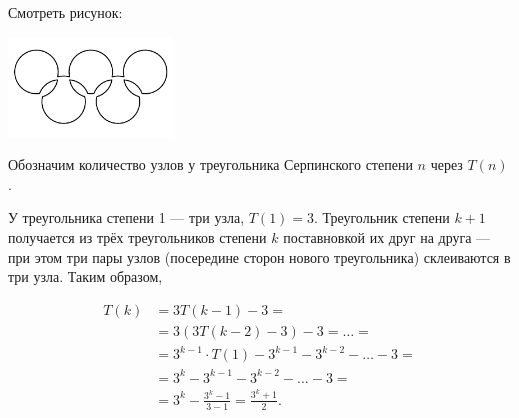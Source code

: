 
\begin{itemize}
\itA Смотреть рисунок:
\vfill\eject

\begin{multicols}{2}

\begin{center}
	\includegraphics[width=4.4cm]{figures/2018-serpinsky-a}
\end{center}

\columnbreak

\begin{center}  \end{center}

\end{multicols}


\itB Обозначим количество узлов у треугольника Серпинского степени $n$ через $T(n)$.

У треугольника степени 1 — три узла, $T(1)=3$. Треугольник степени $k+1$ получается из  трёх треугольников степени $k$ поставновкой их друг на друга — при этом три пары узлов (посередине сторон нового треугольника) склеиваются в три узла. Таким образом,

\begin{align*}
	T(k) & = 3T(k-1) - 3 =\\
	& = 3(3T(k-2)-3)-3 = \ldots = \\
	& = 3^{k-1}\cdot T(1) - 3^{k-1} - 3^{k-2} - \ldots - 3 = \\
	& = 3^k - 3^{k-1} - 3^{k-2} - \ldots - 3 = \\
	& = 3^k - \frac{3^k-1}{3-1} = \frac{3^k+1}{2}. \\
\end{align*}


\end{itemize}
